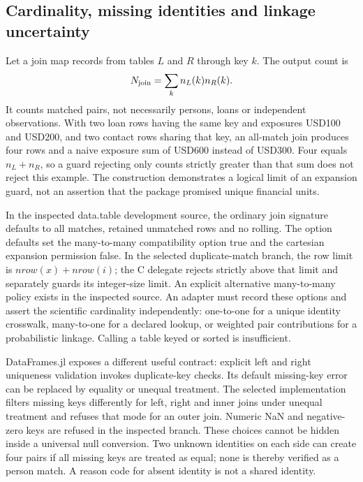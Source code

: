 \subsection{Cardinality, missing identities and linkage uncertainty}

Let a join map records from tables $L$ and $R$ through key $k$. The output count is
\[
 N_{\rm join}=\sum_k n_L(k)n_R(k).
\]
It counts matched pairs, not necessarily persons, loans or independent observations. With two loan rows having the same key and exposures USD100 and USD200, and two contact rows sharing that key, an all-match join produces four rows and a naive exposure sum of USD600 instead of USD300. Four equals $n_L+n_R$, so a guard rejecting only counts strictly greater than that sum does not reject this example. The construction demonstrates a logical limit of an expansion guard, not an assertion that the package promised unique financial units.\citep{exec25_dww_choice}

In the inspected data.table development source, the ordinary join signature defaults to all matches, retained unmatched rows and no rolling. The option defaults set the many-to-many compatibility option true and the cartesian expansion permission false. In the selected duplicate-match branch, the row limit is $nrow(x)+nrow(i)$; the C delegate rejects strictly above that limit and separately guards its integer-size limit. An explicit alternative many-to-many policy exists in the inspected source. An adapter must record these options and assert the scientific cardinality independently: one-to-one for a unique identity crosswalk, many-to-one for a declared lookup, or weighted pair contributions for a probabilistic linkage. Calling a table keyed or sorted is insufficient.\citep{exec25_dww_datatable}

DataFrames.jl exposes a different useful contract: explicit left and right uniqueness validation invokes duplicate-key checks. Its default missing-key error can be replaced by equality or unequal treatment. The selected implementation filters missing keys differently for left, right and inner joins under unequal treatment and refuses that mode for an outer join. Numeric NaN and negative-zero keys are refused in the inspected branch. These choices cannot be hidden inside a universal null conversion. Two unknown identities on each side can create four pairs if all missing keys are treated as equal; none is thereby verified as a person match. A reason code for absent identity is not a shared identity.\citep{exec25_dww_dataframes,exec25_dww_choice}

